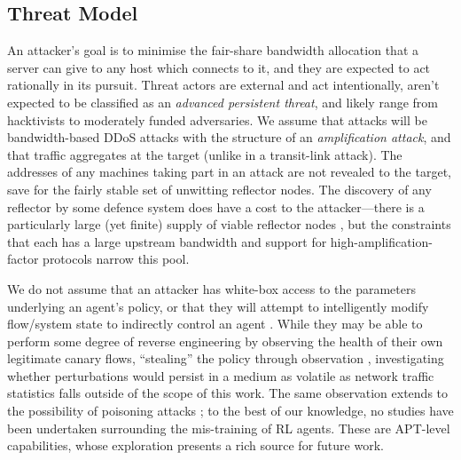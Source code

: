 \documentclass[conference, a4paper, 10pt, times]{IEEEtran}
\begin{document}
\subsection{Threat Model}


An attacker's goal is to minimise the fair-share bandwidth allocation that a server can give to any host which connects to it, and they are expected to act rationally in its pursuit.
Threat actors are external and act intentionally, aren't expected to be classified as an \emph{advanced persistent threat}, and likely range from hacktivists to moderately funded adversaries.
We assume that attacks will be bandwidth-based DDoS attacks with the structure of an \emph{amplification attack}, and that traffic aggregates at the target (unlike in a transit-link attack).
The addresses of any machines taking part in an attack are not revealed to the target, save for the fairly stable set of unwitting reflector nodes.
The discovery of any reflector by some defence system does have a cost to the attacker---there is a particularly large (yet finite) supply of viable reflector nodes \cite{DBLP:conf/ndss/Rossow14}, but the constraints that each has a large upstream bandwidth and support for high-amplification-factor protocols narrow this pool.

We do not assume that an attacker has white-box access to the parameters underlying an agent's policy, or that they will attempt to intelligently modify flow/system state to indirectly control an agent \cite{DBLP:conf/eurosp/PapernotMJFCS16, DBLP:conf/eurosp/PapernotMSW18, DBLP:journals/corr/HuangPGDA17, DBLP:conf/sp/Carlini017}.
While they may be able to perform some degree of reverse engineering by observing the health of their own legitimate canary flows, ``stealing'' the policy through observation \cite{DBLP:conf/uss/TramerZJRR16}, investigating whether perturbations would persist in a medium as volatile as network traffic statistics falls outside of the scope of this work.
The same observation extends to the possibility of poisoning attacks \cite{DBLP:journals/jmlr/KloftL10, DBLP:conf/acsac/ShenTS16}; to the best of our knowledge, no studies have been undertaken surrounding the mis-training of RL agents.
These are APT-level capabilities, whose exploration presents a rich source for future work.
\end{document}
